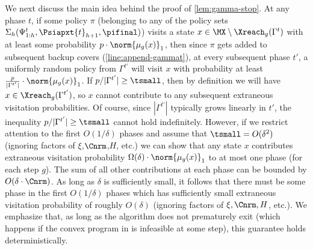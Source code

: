 \documentclass[11pt, oneside]{article}
\theoremstyle{plain}
\theoremstyle{definition}
\numberwithin{theorem}{section}
\renewcommand{\^}[1]{^{(#1)}}
\begin{document}
We next discuss the main idea behind the proof of \cref{lem:gamma-stop}. At any phase $t$, if some policy $\pi$ (belonging to any of the policy sets $\Sigma_h(\Psi_{1:h}^t,\Psiapxt{t}_{h+1},\pifinal)$) visits a state $x \in \MX\setminus\Xreach_g(\Gamma^t)$ with at least some probability $p \cdot \norm{\mu_g(x)}_1$, then since $\pi$ gets added to subsequent backup covers (\cref{line:append-gammat}), at every subsequent phase $t'$, a uniformly random policy from $\Gamma^{t'}$ will visit $x$ with probability at least $\frac{p}{|\Gamma^{t'}|}\cdot \norm{\mu_g(x)}_1$. If $p/|\Gamma^{t'}| \geq \tsmall$, then by definition we will have $x \in \Xreach_g(\Gamma^{t'})$, so $x$ cannot contribute to any subsequent extraneous visitation probabilities. Of course, since $|\Gamma^{t'}|$ typically grows linearly in $t'$, the inequality $p / |\Gamma^{t'}| \geq \tsmall$ cannot hold indefinitely. However, if we restrict attention to the first $O(1/\delta)$ phases and assume that $\tsmall = O(\delta^2)$ (ignoring factors of $\xi$,$\Cnrm$,$H$, etc.) we can show that any state $x$ contributes extraneous visitation probability $\Omega(\delta) \cdot \norm{\mu_g(x)}_1$ to at most one phase (for each step $g$). The sum of all other contributions at each phase can be bounded by $O(\delta \cdot \Cnrm)$. As long as $\delta$ is sufficiently small, it follows that there must be some phase in the first $O(1/\delta)$ phases which has sufficiently small extraneous visitation probability of roughly $O(\delta)$ (ignoring factors of $\xi, \Cnrm, H$, etc.). 
We emphasize that, as long as the algorithm \SLMt{} does not 
prematurely exit (which happens if the convex program in \ESCt is infeasible at some step), this guarantee holds deterministically. %
\end{document}
